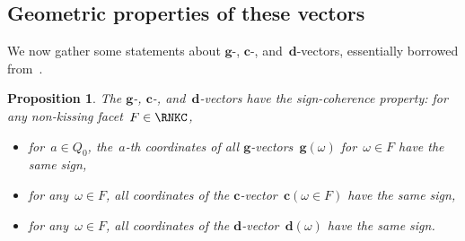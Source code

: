 \documentclass{amsart}
\newtheorem{proposition}[theorem]{Proposition}
\theoremstyle{definition}
\renewcommand{\b}[1]{\mathbf{#1}} %
\newcommand{\darkblue}{\color{darkblue}} %
\newcommand{\defn}[1]{\textsl{\darkblue #1}} %
\newcommand{\surface}{\mathcal{S}} %
\newcommand{\dual}{^*} %
\newcommand{\dissection}{\mathrm{D}} %
\newcommand{\curveof}{\operatorname{\gamma}} %
\newcommand{\dvector}[1]{\mathbf{d}(#1)} %
\newcommand{\gvector}[1]{\mathbf{g}(#1)} %
\newcommand{\cvector}[2]{\mathbf{c}(#1 \in #2)} %
\begin{document}
%

\subsection{Geometric properties of these vectors}
\label{subsec:geometricProperties}

We now gather some statements about $\b{g}$-, $\b{c}$-, and~$\b{d}$-vectors, essentially borrowed from~\cite[Part.~4]{PaluPilaudPlamondon}.

\begin{proposition}
\label{rem:signCoherence}
The $\b{g}$-, $\b{c}$-, and~$\b{d}$-vectors have the \defn{sign-coherence property}: for any non-kissing facet~$F \in \RNKC$,
\begin{itemize}
\item for~$a \in Q_0$, the~$a$-th coordinates of all $\b{g}$-vectors~$\gvector{\omega}$ for~$\omega \in F$ have the same sign,
\item for any~$\omega \in F$, all coordinates of the $\b{c}$-vector~$\cvector{\omega}{F}$ have the same sign,
\item for any~$\omega \in F$, all coordinates of the $\b{d}$-vector~$\dvector{\omega}$ have the same sign.
\end{itemize}
\end{proposition}
\end{document}
